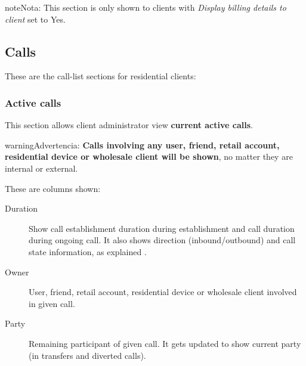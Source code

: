 \documentclass[letterpaper,10pt,spanish]{sphinxmanual}
\begin{document}
\begin{notice}{note}{Nota:}
This section is only shown to clients with \emph{Display billing details to client} set to Yes.
\end{notice}


\subsection{Calls}
\label{administration_portal/client/residential/calls/index::doc}\label{administration_portal/client/residential/calls/index:calls}
These are the call-list sections for residential clients:


\subsubsection{Active calls}
\label{administration_portal/client/residential/calls/active_calls::doc}\label{administration_portal/client/residential/calls/active_calls:active-calls}
This section allows client administrator view \textbf{current active calls}.

\begin{notice}{warning}{Advertencia:}
\textbf{Calls involving any user, friend, retail account, residential device or wholesale client will be shown},
no matter they are internal or external.
\end{notice}

These are columns shown:
\begin{description}
\item[{Duration}] \leavevmode{}\label{administration_portal/client/residential/calls/active_calls:term-duration}
Show call establishment duration during establishment and call duration during ongoing call. It also shows
direction (inbound/outbound) and call state information, as explained {\hyperref[administration_portal/platform/active_calls:call\string-state]{}}.

\item[{Owner}] \leavevmode{}\label{administration_portal/client/residential/calls/active_calls:term-owner}
User, friend, retail account, residential device or wholesale client involved in given call.

\item[{Party}] \leavevmode{}\label{administration_portal/client/residential/calls/active_calls:term-party}
Remaining participant of given call. It gets updated to show current party (in transfers and diverted calls).

\end{description}
\end{document}

